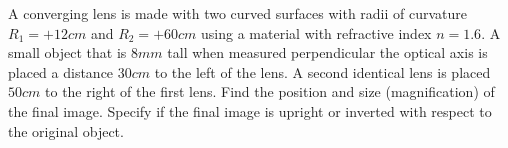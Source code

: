 \documentclass[10pt]{article}
\newenvironment{problem}[2][Problem]{\begin{trivlist}
\item[\hskip \labelsep {\bfseries #1}\hskip \labelsep {\bfseries #2.}]}{\end{trivlist}}
\begin{document}
\begin{problem}{6}
A converging lens is made with two curved surfaces with radii of curvature $R_1=+12cm$ and $R_2=+60cm$ using a material with refractive index $n=1.6$. A small object that is $8mm$ tall when measured perpendicular the optical axis is placed a distance $30cm$ to the left of the lens. A second identical lens is placed $50cm$ to the right of the first lens. Find the position and size (magnification) of the final image. Specify if the final image is upright or inverted with respect to the original object.
\end{problem}




\end{document}

